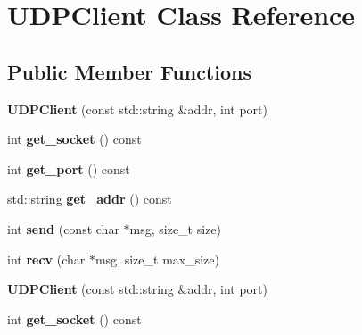\hypertarget{classUDPClient}{\section{\-U\-D\-P\-Client \-Class \-Reference}
\label{classUDPClient}
}
\subsection*{\-Public \-Member \-Functions}
\begin{DoxyCompactItemize}
\item 
\hypertarget{classUDPClient_a97e34fe6f6f17bab4bd031ea1b79de7c}{{\bfseries \-U\-D\-P\-Client} (const std\-::string \&addr, int port)}\label{classUDPClient_a97e34fe6f6f17bab4bd031ea1b79de7c}

\item 
\hypertarget{classUDPClient_a5ac1eddc517f62615fae91d5efea2cc8}{int {\bfseries get\-\_\-socket} () const }\label{classUDPClient_a5ac1eddc517f62615fae91d5efea2cc8}

\item 
\hypertarget{classUDPClient_a1704aa3773d5133d3dd27b4ab90d6ed7}{int {\bfseries get\-\_\-port} () const }\label{classUDPClient_a1704aa3773d5133d3dd27b4ab90d6ed7}

\item 
\hypertarget{classUDPClient_a9c447c882c46dcdd0ce449feea44fd5d}{std\-::string {\bfseries get\-\_\-addr} () const }\label{classUDPClient_a9c447c882c46dcdd0ce449feea44fd5d}

\item 
\hypertarget{classUDPClient_a1f1e12cba5f35d9436e64bc1784171f8}{int {\bfseries send} (const char $\ast$msg, size\-\_\-t size)}\label{classUDPClient_a1f1e12cba5f35d9436e64bc1784171f8}

\item 
\hypertarget{classUDPClient_a0d68aacc0fc4e1842885178c362e97d1}{int {\bfseries recv} (char $\ast$msg, size\-\_\-t max\-\_\-size)}\label{classUDPClient_a0d68aacc0fc4e1842885178c362e97d1}

\item 
\hypertarget{classUDPClient_a97e34fe6f6f17bab4bd031ea1b79de7c}{{\bfseries \-U\-D\-P\-Client} (const std\-::string \&addr, int port)}\label{classUDPClient_a97e34fe6f6f17bab4bd031ea1b79de7c}

\item 
\hypertarget{classUDPClient_a5ac1eddc517f62615fae91d5efea2cc8}{int {\bfseries get\-\_\-socket} () const }\label{classUDPClient_a5ac1eddc517f62615fae91d5efea2cc8}


\end{DoxyCompactItemize}
